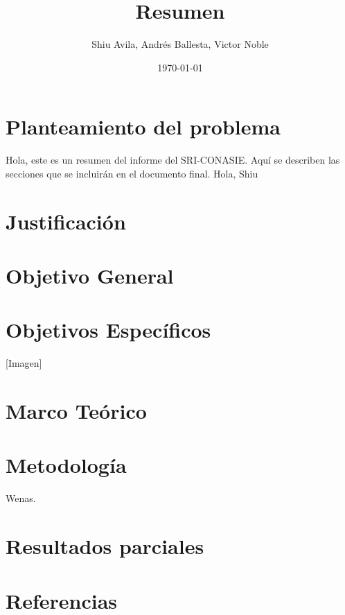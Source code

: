\documentclass[12pt,a4paper]{article}
\title{Resumen}
\author{Shiu Avila, Andrés Ballesta, Victor Noble}
\date{\today}
\begin{document}
\maketitle

\section{Planteamiento del problema}

Hola, este es un resumen del informe del SRI-CONASIE. Aquí se describen las secciones que se incluirán en el documento final.
Hola, Shiu

\section{Justificación}

\section{Objetivo General}
\section{Objetivos Específicos}

[Imagen]

\section{Marco Teórico}
\section{Metodología}

Wenas.

\section{Resultados parciales}
\section{Referencias}
\end{document}
